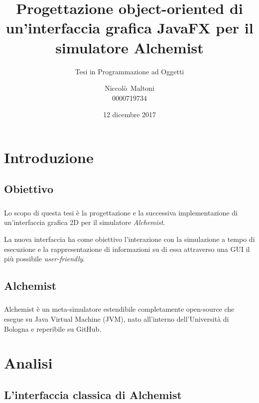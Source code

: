\documentclass[%
]{beamer}
\title[Nuova GUI Alchemist in JavaFX]{%
    Progettazione object-oriented di un'interfaccia grafica %
    JavaFX per il simulatore Alchemist
}
\subtitle{Tesi in Programmazione ad Oggetti}
\author[Niccolò~Maltoni]{Niccolò~Maltoni\\0000719734}
\date{12 dicembre 2017}
\institute[]{%
    Alma Mater Studiorum - Università di Bologna\\%
    Campus di Cesena%
}
\newcommand{\engEmph}[1] {\emph{\foreignlanguage{english}#1}}
\begin{document}
    \begin{frame}
        \titlepage
    \end{frame}

    \section{Introduzione}\label{sec:intro}
        \subsection{Obiettivo}\label{subsec:obiettivo}
            \begin{frame}
                \frametitle{\insertsection}
                \framesubtitle{\insertsubsection}
                Lo scopo di questa tesi è la progettazione e la successiva implementazione di un'interfaccia grafica 2D per il simulatore \emph{Alchemist}.

                \medskip
                \pause

                La nuova interfaccia ha come obiettivo l'interazione con la simulazione a tempo di esecuzione e la rappresentazione di informazioni su di essa attraverso una GUI il più possibile \engEmph{user-friendly}.
            \end{frame}

        \subsection{Alchemist}\label{subsec:alchemist}
            \begin{frame}
                \frametitle{\insertsection}
                \framesubtitle{\insertsubsection}

                Alchemist è un meta-simulatore estendibile completamente open-source che esegue su Java Virtual Machine (JVM), nato all’interno dell’Università di Bologna e reperibile su GitHub.
            \end{frame}

    \section{Analisi}\label{sec:analisi}
        \subsection{L'interfaccia classica di Alchemist}\label{subsec:oldgui}
\end{document}
